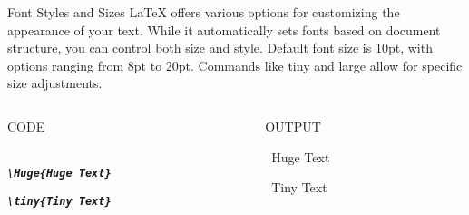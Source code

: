 \documentclass[pdf]{beamer}
\begin{document}
\begin{frame}{Font Styles and Sizes}
    LaTeX offers various options for customizing the 
    appearance of your text. While it automatically 
    sets fonts based on document structure, you can 
    control both size and style. Default font size is 
    10pt, with options ranging from 8pt to 20pt. 
    Commands like tiny and large allow for specific 
    size adjustments.
    \begin{columns}
        \begin{column}{0.5\textwidth}
            \begin{center}
                CODE\\~\\
            \end{center}
            \par \small{\textbf{\textit{\texttt{\textbackslash Huge\{Huge Text\}}}}}
            \par \small{\textbf{\textit{\texttt{\textbackslash tiny\{Tiny Text\}}}}}
        \end{column}
        \vrule
        \begin{column}{0.5\textwidth}
            \begin{center}
                OUTPUT
            \end{center}
            \par \, \Huge{Huge Text}
            \par \, \tiny{Tiny Text}
        \end{column}
    \end{columns}

\end{frame}
\end{document}
